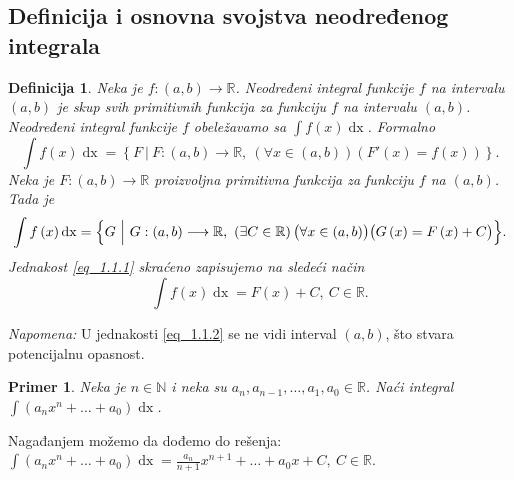 \documentclass{article}
\newtheorem{definicija}{Definicija}[section]
\newtheorem{prim}{Primer}[section]
\DeclareMathOperator{\dx}{dx}
\begin{document}
\subsection{Definicija i osnovna svojstva neodređenog integrala}
\begin{defbox}
    \label{definicija_1.2}
    \begin{definicija}
        Neka je $f: \left(a, b\right) \longrightarrow \mathbb{R}$. Neodređeni integral
        funkcije $f$ na intervalu $\left(a, b\right)$ je skup svih primitivnih funkcija
        za funkciju $f$ na intervalu $\left(a, b\right)$. Neodređeni integral funkcije
        $f$ obeležavamo sa $\displaystyle\int f\left(x\right)\dx$. Formalno
        $$\int f\left(x\right)\dx=\left\{F\ \Big|\ F:\left(a,b\right)\longrightarrow\mathbb{R},
            \ \left(\forall x\in\left(a,b\right)\right)\left(F'\left(x\right)=
            f\left(x\right)\right)\right\}.$$
        Neka je $F:\left(a,b\right)\longrightarrow\mathbb{R}$ proizvoljna primitivna
        funkcija za funkciju $f$ na $\left(a,b\right)$. Tada je
        \begin{equation}
            \label{eq_1.1.1}
            \int f\left(x\right)\dx =\Bigl\{G\ \Big|\ G: \left(a,b\right)\longrightarrow\mathbb{R},
            \ \left(\exists C\in\mathbb{R}\right)\bigl(\forall x\in\left(a,b\right)\bigr)
            \bigl(G\left(x\right)=F\left(x\right)+C\bigr)\Bigr\}.
        \end{equation}
        Jednakost \eqref{eq_1.1.1} skraćeno zapisujemo na sledeći način
        \begin{equation}
            \label{eq_1.1.2}
            \int f\left(x\right)\dx=F\left(x\right)+C,\ C\in\mathbb{R}.
        \end{equation}
    \end{definicija}
    \textit{Napomena:} U jednakosti \eqref{eq_1.1.2} se ne vidi interval $\left(a,b\right)$,
    što stvara potencijalnu opasnost.
\end{defbox}

\begin{primbox}
    \label{primer_1.3}
    \begin{prim}
        Neka je $n\in\mathbb{N}$ i neka su $a_n,a_{n-1},\dotsc,a_1,a_0\in\mathbb{R}$.
        Naći integral $\displaystyle\int\left(a_nx^n+\dotsc+a_0\right)\dx$.
    \end{prim}
    Nagađanjem možemo da dođemo do rešenja: $\displaystyle\int\left(a_nx^n+\dotsc+a_0\right)\dx=
        \frac{a_n}{n+1}x^{n+1}+\dotsc+a_0x+C,\ C\in\mathbb{R}$.
\end{primbox}
\end{document}
